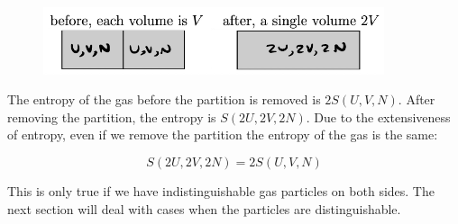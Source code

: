 \begin{figure}[H]
	\centering
	\includegraphics[width=100mm]{37.png}
\end{figure}

The entropy of the gas before the partition is removed is $2S(U,V,N)$. After removing the partition, the entropy is $S(2U,2V,2N)$. Due to the extensiveness of entropy, even if we remove the partition the entropy of the gas is the same:

\[S(2U,2V,2N)=2S(U,V,N)\]

This is only true if we have indistinguishable gas particles on both sides. The next section will deal with cases when the particles are distinguishable.

